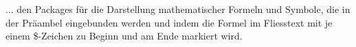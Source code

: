 
... den Packages für die Darstellung mathematischer Formeln und Symbole, die in der Präambel eingebunden werden und indem die Formel im Fliesstext mit je einem \$-Zeichen zu Beginn und am Ende markiert wird.
